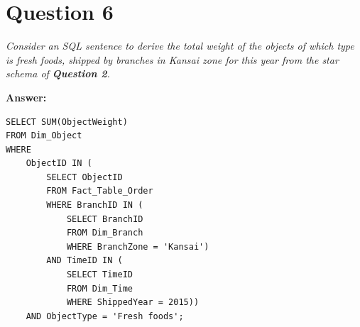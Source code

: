 \documentclass[a4paper,11pt]{article}
\begin{document}
\section*{Question 6}

\textit{Consider an SQL sentence to derive the total weight of the objects of which type is fresh foods, shipped by branches in Kansai zone for this year from the star schema of \textbf{Question 2}.} 

\noindent
\textbf{Answer:} 
\vspace{-1.5em}
\begin{lstlisting}[label={list:first},caption=SQL sentence for total weight of `Fresh foods' delivered in `Kansai' this year (2015)]
SELECT SUM(ObjectWeight)
FROM Dim_Object
WHERE 
    ObjectID IN (
        SELECT ObjectID
        FROM Fact_Table_Order
        WHERE BranchID IN (
            SELECT BranchID
            FROM Dim_Branch
            WHERE BranchZone = 'Kansai')
        AND TimeID IN (
            SELECT TimeID
            FROM Dim_Time
            WHERE ShippedYear = 2015))
    AND ObjectType = 'Fresh foods';
\end{lstlisting}
\end{document}
